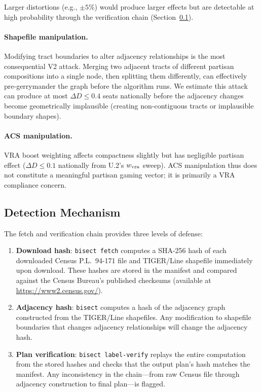 Larger distortions (e.g., $\pm 5\%$) would produce larger effects
but are detectable at high probability through the verification chain
(Section~\ref{sec:v2-detection}).

\paragraph{Shapefile manipulation.}
Modifying tract boundaries to alter adjacency relationships is the most
consequential V2 attack.
Merging two adjacent tracts of different partisan compositions into a
single node, then splitting them differently, can effectively pre-gerrymander
the graph before the algorithm runs.
We estimate this attack can produce at most $\Delta D \leq 0.4$ seats
nationally before the adjacency changes become geometrically implausible
(creating non-contiguous tracts or implausible boundary shapes).

\paragraph{ACS manipulation.}
VRA boost weighting affects compactness slightly but has negligible partisan
effect ($\Delta D \leq 0.1$ nationally from U.2's $w_{\rm vra}$ sweep).
ACS manipulation thus does not constitute a meaningful partisan gaming vector;
it is primarily a VRA compliance concern.

\subsection{Detection Mechanism}
\label{sec:v2-detection}

The \bisect{} fetch and verification chain provides three levels of defense:
\begin{enumerate}
\item \textbf{Download hash}: \texttt{bisect fetch} computes a SHA-256 hash
  of each downloaded Census P.L.\ 94-171 file and TIGER/Line shapefile
  immediately upon download.
  These hashes are stored in the manifest and compared against the Census
  Bureau's published checksums (available at
  \url{https://www2.census.gov/}).
\item \textbf{Adjacency hash}: \texttt{bisect} computes a hash of the
  adjacency graph constructed from the TIGER/Line shapefiles.
  Any modification to shapefile boundaries that changes adjacency
  relationships will change the adjacency hash.
\item \textbf{Plan verification}: \texttt{bisect label-verify} replays the
  entire computation from the stored hashes and checks that the output
  plan's hash matches the manifest.
  Any inconsistency in the chain---from raw Census file through adjacency
  construction to final plan---is flagged.
\end{enumerate}

